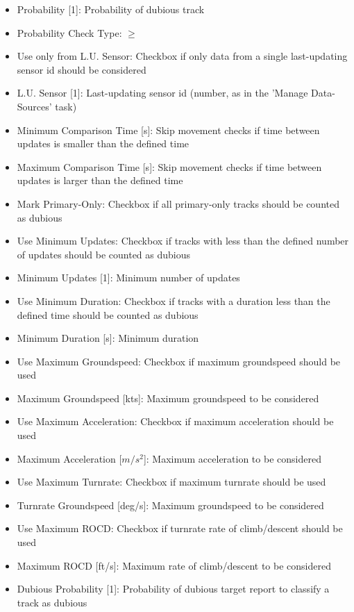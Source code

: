 \begin{itemize}  
\item Probability [1]: Probability of dubious track
\item Probability Check Type: $\geq$
\item Use only from L.U. Sensor: Checkbox if only data from a single last-updating sensor id should be considered
\item L.U. Sensor [1]: Last-updating sensor id (number, as in the 'Manage Data-Sources' task)
\item Minimum Comparison Time [s]: Skip movement checks if time between updates is smaller than the defined time
\item Maximum Comparison Time [s]: Skip movement checks if time between updates is larger than the defined time
\item Mark Primary-Only: Checkbox if all primary-only tracks should be counted as dubious
\item Use Minimum Updates: Checkbox if tracks with less than the defined number of updates should be counted as dubious
\item Minimum Updates [1]: Minimum number of updates
\item Use Minimum Duration: Checkbox if tracks with a duration less than the defined time should be counted as dubious
\item Minimum Duration [s]: Minimum duration
\item Use Maximum Groundspeed: Checkbox if maximum groundspeed should be used
\item Maximum Groundspeed [kts]: Maximum groundspeed to be considered
\item Use Maximum Acceleration: Checkbox if maximum acceleration should be used
\item Maximum Acceleration [$m/s^{2}$]: Maximum acceleration to be considered
\item Use Maximum Turnrate: Checkbox if maximum turnrate should be used
\item Turnrate Groundspeed [deg/s]: Maximum groundspeed to be considered
\item Use Maximum ROCD: Checkbox if turnrate rate of climb/descent should be used
\item Maximum ROCD [ft/s]: Maximum  rate of climb/descent to be considered
\item Dubious Probability [1]: Probability of dubious target report to classify a track as dubious
\end{itemize}
\ \\

